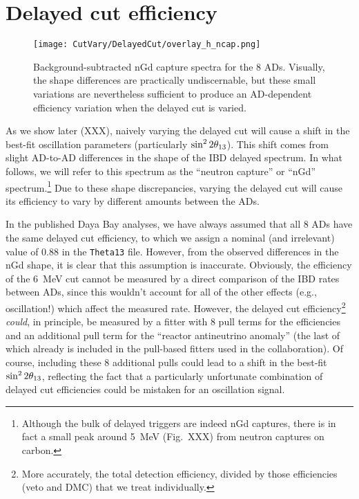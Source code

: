 \documentclass[../thesis.tex]{subfiles}
\begin{document}
\section{Delayed cut efficiency}
\label{sec:cutVaryDelCutEff}

\begin{figure}[ht]
  \texttt{[image: CutVary/DelayedCut/overlay\_h\_ncap.png]}
  \caption{Background-subtracted nGd capture spectra for the 8 ADs. Visually, the shape differences are practically undiscernable, but these small variations are nevertheless sufficient to produce an AD-dependent efficiency variation when the delayed cut is varied.}
  \label{fig:cutVaryDelCutSpecOverlay}
\end{figure}

As we show later (XXX), naively varying the delayed cut will cause a shift in the best-fit oscillation parameters (particularly $\sin^2 2\theta_{13}$). This shift comes from slight AD-to-AD differences in the shape of the IBD delayed spectrum. In what follows, we will refer to this spectrum as the ``neutron capture'' or ``nGd'' spectrum.\footnote{Although the bulk of delayed triggers are indeed nGd captures, there is in fact a small peak around 5~MeV (Fig.~XXX) from neutron captures on carbon.} Due to these shape discrepancies, varying the delayed cut will cause its efficiency to vary by different amounts between the ADs.

In the published Daya Bay analyses, we have always assumed that all 8 ADs have the same delayed cut efficiency, to which we assign a nominal (and irrelevant) value of 0.88 in the \texttt{Theta13} file. However, from the observed differences in the nGd shape, it is clear that this assumption is inaccurate. Obviously, the efficiency of the 6~MeV cut cannot be measured by a direct comparison of the IBD rates between ADs, since this wouldn't account for all of the other effects (e.g., oscillation!) which affect the measured rate. However, the delayed cut efficiency\footnote{More accurately, the total detection efficiency, divided by those efficiencies (veto and DMC) that we treat individually.} \emph{could}, in principle, be measured by a fitter with 8 pull terms for the efficiencies and an additional pull term for the ``reactor antineutrino anomaly'' (the last of which already is included in the pull-based fitters used in the collaboration). Of course, including these 8 additional pulls could lead to a shift in the best-fit $\sin^2 2\theta_{13}$, reflecting the fact that a particularly unfortunate combination of delayed cut efficiencies could be mistaken for an oscillation signal.
\end{document}
